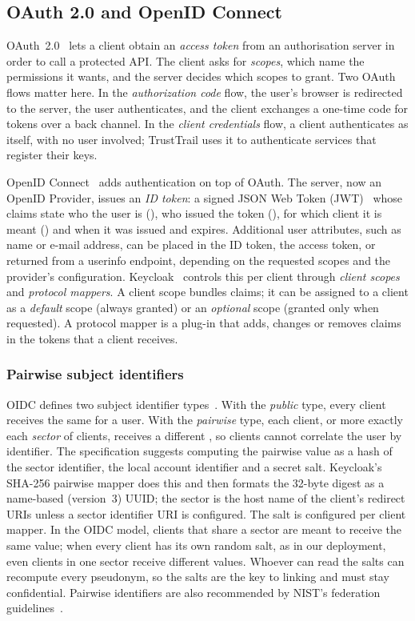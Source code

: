 \subsection{OAuth 2.0 and OpenID Connect}
OAuth~2.0~\cite{rfc6749} lets a client obtain an \emph{access token} from an authorisation server in order to call a protected API. The client asks for \emph{scopes}, which name the permissions it wants, and the server decides which scopes to grant. Two OAuth flows matter here. In the \emph{authorization code} flow, the user's browser is redirected to the server, the user authenticates, and the client exchanges a one-time code for tokens over a back channel. In the \emph{client credentials} flow, a client authenticates as itself, with no user involved; TrustTrail uses it to authenticate services that register their keys.

OpenID Connect~\cite{oidccore} adds authentication on top of OAuth. The server, now an OpenID Provider, issues an \emph{ID token}: a signed JSON Web Token (JWT)~\cite{rfc7519} whose claims state who the user is (), who issued the token (), for which client it is meant () and when it was issued and expires. Additional user attributes, such as name or e-mail address, can be placed in the ID token, the access token, or returned from a userinfo endpoint, depending on the requested scopes and the provider's configuration. Keycloak~\cite{keycloakdocs} controls this per client through \emph{client scopes} and \emph{protocol mappers}. A client scope bundles claims; it can be assigned to a client as a \emph{default} scope (always granted) or an \emph{optional} scope (granted only when requested). A protocol mapper is a plug-in that adds, changes or removes claims in the tokens that a client receives.

\subsubsection{Pairwise subject identifiers}
OIDC defines two subject identifier types~\cite[Sec.~8]{oidccore}. With the \emph{public} type, every client receives the same  for a user. With the \emph{pairwise} type, each client, or more exactly each \emph{sector} of clients, receives a different , so clients cannot correlate the user by identifier. The specification suggests computing the pairwise value as a hash of the sector identifier, the local account identifier and a secret salt. Keycloak's SHA-256 pairwise mapper does this and then formats the 32-byte digest as a name-based (version~3) UUID; the sector is the host name of the client's redirect URIs unless a sector identifier URI is configured. The salt is configured per client mapper. In the OIDC model, clients that share a sector are meant to receive the same value; when every client has its own random salt, as in our deployment, even clients in one sector receive different values. Whoever can read the salts can recompute every pseudonym, so the salts are the key to linking and must stay confidential. Pairwise identifiers are also recommended by NIST's federation guidelines~\cite{nist80063c}.


